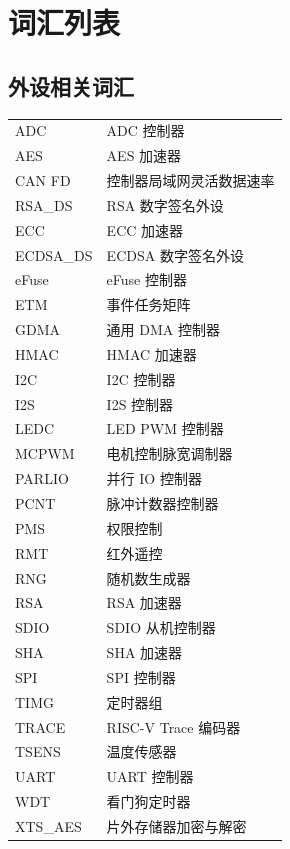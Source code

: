 \section*{词汇列表}\label{glossary}
\rhead{\Navigation}

\subsection*{外设相关词汇}

\begin{longtable}[c]{p{3cm}p{12cm} }

ADC & ADC 控制器 \\
AES & AES 加速器 \\
CAN FD & 控制器局域网灵活数据速率\\
RSA\_DS & RSA 数字签名外设 \\
ECC & ECC 加速器 \\
ECDSA\_DS & ECDSA 数字签名外设 \\
eFuse & eFuse 控制器 \\
ETM & 事件任务矩阵 \\
GDMA & 通用 DMA 控制器 \\
HMAC & HMAC 加速器 \\
I2C & I2C 控制器 \\
I2S & I2S 控制器 \\
LEDC & LED PWM 控制器 \\
MCPWM & 电机控制脉宽调制器 \\
PARLIO & 并行 IO 控制器 \\
PCNT & 脉冲计数器控制器 \\
PMS & 权限控制 \\
RMT & 红外遥控 \\
RNG & 随机数生成器 \\
RSA & RSA 加速器 \\
SDIO & SDIO 从机控制器 \\
SHA & SHA 加速器 \\
SPI & SPI 控制器 \\
TIMG & 定时器组 \\
TRACE & RISC-V Trace 编码器 \\
TSENS & 温度传感器 \\
UART & UART 控制器 \\
WDT & 看门狗定时器 \\
XTS\_AES & 片外存储器加密与解密 \\

\end{longtable}




